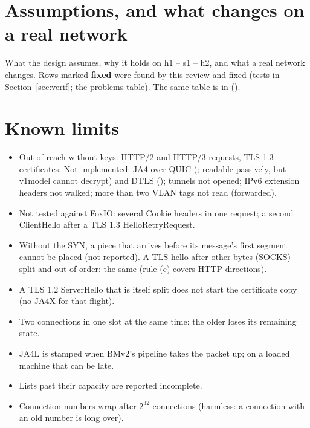 \section{Assumptions, and what changes on a real network}
\label{sec:assumptions}
What the design assumes, why it holds on h1 -- s1 -- h2, and what a real network changes. Rows marked
\textbf{fixed} were found by this review and fixed (tests in Section~\ref{sec:verif}; the problems table). The same
table is in  ().



\section{Known limits}
\label{sec:limits}
\begin{itemize}
\item Out of reach without keys: HTTP/2 and HTTP/3 requests, TLS 1.3 certificates. Not implemented: JA4 over QUIC
  (; readable passively, but v1model cannot decrypt) and DTLS (); tunnels not opened; IPv6
  extension headers not walked; more than two VLAN tags not read (forwarded).
\item Not tested against FoxIO: several Cookie headers in one request; a second ClientHello after a TLS 1.3
  HelloRetryRequest.
\item Without the SYN, a piece that arrives before its message's first segment cannot be placed (not reported).
  A TLS hello after other bytes (SOCKS) split and out of order: the same (rule (e) covers HTTP directions).
\item A TLS 1.2 ServerHello that is itself split does not start the certificate copy (no JA4X for that flight).
\item Two connections in one slot at the same time: the older loses its remaining state.
\item JA4L is stamped when BMv2's pipeline takes the packet up; on a loaded machine that can be late.
\item Lists past their capacity are reported incomplete.
\item Connection numbers wrap after $2^{32}$ connections (harmless: a connection with an old number is long over).
\end{itemize}
